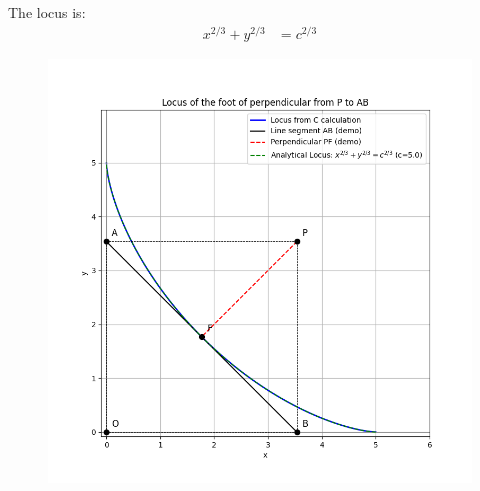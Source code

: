 \documentclass[journal]{IEEEtran}
\begin{document}
The locus is:
\begin{align}
x^{2/3} + y^{2/3} &= c^{2/3}
\end{align}
\begin{figure}[H]
\centering
\includegraphics[width=0.7\columnwidth]{figs/fig1.png}
\caption{}
\label{fig:1}
\end{figure}
\end{document}
